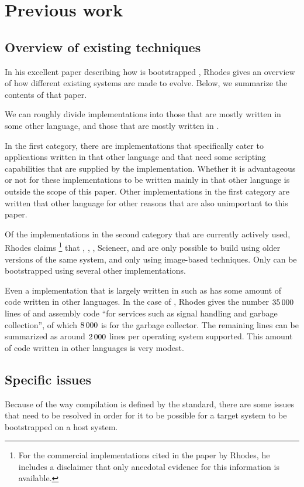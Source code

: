 \section{Previous work}

\subsection{Overview of existing techniques}

In his excellent paper describing how \sbcl{} is bootstrapped
\cite{Rhodes:2008:SSC:1482373.1482380}, Rhodes gives an overview of
how different existing \commonlisp{} systems are made to evolve.
Below, we summarize the contents of that paper.

We can roughly divide \commonlisp{} implementations into those that
are mostly written in some other language, and those that are mostly
written in \commonlisp{}.

In the first category, there are implementations that specifically
cater to applications written in that other language and that need
some scripting capabilities that are supplied by the \commonlisp{}
implementation.  Whether it is advantageous or not for these
implementations to be written mainly in that other language is outside
the scope of this paper.  Other implementations in the first category
are written that other language for other reasons that are also
unimportant to this paper.

Of the implementations in the second category that are currently
actively used, Rhodes claims%
\footnote{For the commercial \commonlisp{} implementations cited in
  the paper by Rhodes, he includes a disclaimer that only anecdotal
  evidence for this information is available.}
that \allegro{}, \lispworks{}, \cmucl{}, Scieneer, and \ccl{} are only
possible to build using older versions of the same system, and only
using image-based techniques.  Only \sbcl{} can be bootstrapped using
several other \commonlisp{} implementations.

Even a \commonlisp{} implementation that is largely written in
\commonlisp{} such as \sbcl{} has some amount of code written in other
languages.  In the case of \sbcl{}, Rhodes gives the number
$35\thinspace000$ lines of \clanguage{} and assembly code ``for
services such as signal handling and garbage collection'', of which
$8\thinspace000$ is for the garbage collector.  The remaining lines
can be summarized as around $2\thinspace000$ lines per operating
system supported.  This amount of code written in other languages is
very modest.

\subsection{Specific \commonlisp{} issues}

Because of the way compilation is defined by the \commonlisp{}
standard, there are some issues that need to be resolved in order for
it to be possible for a target \commonlisp{} system to be bootstrapped
on a host \commonlisp{} system.
